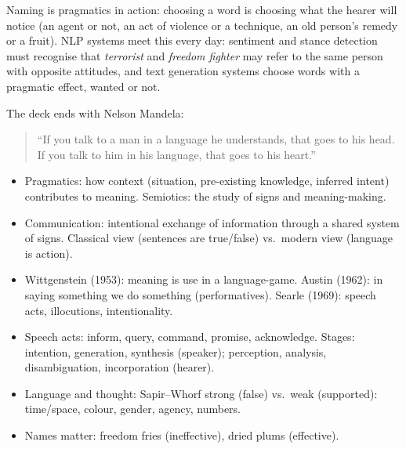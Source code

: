 \begin{nbwhy}
Naming is pragmatics in action: choosing a word is choosing what the hearer will notice
(an agent or not, an act of violence or a technique, an old person's remedy or a fruit).
NLP systems meet this every day: sentiment and stance detection must recognise that
\emph{terrorist} and \emph{freedom fighter} may refer to the same person with opposite
attitudes, and text generation systems choose words with a pragmatic effect, wanted or
not.
\end{nbwhy}

The deck ends with Nelson Mandela:

\begin{quote}
``If you talk to a man in a language he understands, that goes to his head. If you talk
to him in his language, that goes to his heart.''
\end{quote}

\begin{nbsummary}[pragmatics]
\begin{itemize}[nosep]
  \item Pragmatics: how context (situation, pre-existing knowledge, inferred intent)
        contributes to meaning. Semiotics: the study of signs and meaning-making.
  \item Communication: intentional exchange of information through a shared system of
        signs. Classical view (sentences are true/false) vs.\ modern view (language is
        action).
  \item Wittgenstein (1953): meaning is use in a language-game. Austin (1962): in saying
        something we do something (performatives). Searle (1969): speech acts,
        illocutions, intentionality.
  \item Speech acts: inform, query, command, promise, acknowledge. Stages: intention,
        generation, synthesis (speaker); perception, analysis, disambiguation,
        incorporation (hearer).
  \item Language and thought: Sapir--Whorf strong (false) vs.\ weak (supported):
        time/space, colour, gender, agency, numbers.
  \item Names matter: freedom fries (ineffective), dried plums (effective).
\end{itemize}
\end{nbsummary}
